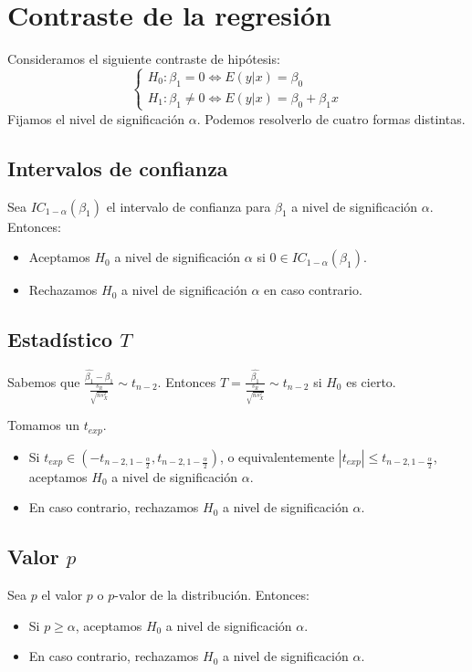\documentclass{report}
\theoremstyle{remark}
\theoremstyle{remark}
\theoremstyle{remark}
\theoremstyle{definition}
\theoremstyle{definition}
\theoremstyle{definition}
\begin{document}
\section{Contraste de la regresión}
Consideramos el siguiente contraste de hipótesis:
$$\begin{cases}
        H_0 : \beta_1 = 0 \Leftrightarrow E(y|x) = \beta_0 \\
        H_1 : \beta_1 \neq 0 \Leftrightarrow E(y|x) = \beta_0 + \beta_1x
    \end{cases}$$
Fijamos el nivel de significación $\alpha$.
Podemos resolverlo de cuatro formas distintas.

\subsection*{Intervalos de confianza}
Sea $IC_{1-\alpha}(\beta_1)$ el intervalo de confianza para $\beta_1$ a nivel de significación $\alpha$.
Entonces:
\begin{itemize}
    \item Aceptamos $H_0$ a nivel de significación $\alpha$ si $0 \in IC_{1-\alpha}(\beta_1)$.
    \item Rechazamos $H_0$ a nivel de significación $\alpha$ en caso contrario.
\end{itemize}

\subsection*{Estadístico $T$}
Sabemos que $\frac{\hat{\beta_1} - \beta_1}{\frac{s_R}{\sqrt{ns_X^2}}} \sim t_{n-2}$.
Entonces $T = \frac{\hat{\beta_1}}{\frac{s_R}{\sqrt{ns_X^2}}} \sim t_{n-2}$ si $H_0$ es cierto.

Tomamos un $t_{exp}$.
\begin{itemize}
    \item Si $t_{exp} \in (-t_{n-2, 1-\frac{\alpha}{2}}, t_{n-2, 1-\frac{\alpha}{2}})$, o equivalentemente $|t_{exp}| \leq t_{n-2, 1-\frac{\alpha}{2}}$, aceptamos $H_0$ a nivel de significación $\alpha$.
    \item En caso contrario, rechazamos $H_0$ a nivel de significación $\alpha$.
\end{itemize}

\subsection*{Valor $p$}
Sea $p$ el valor $p$ o $p$-valor de la distribución. Entonces:
\begin{itemize}
    \item Si $p \geq \alpha$, aceptamos $H_0$ a nivel de significación $\alpha$.
    \item En caso contrario, rechazamos $H_0$ a nivel de significación $\alpha$.
\end{itemize}
\end{document}
